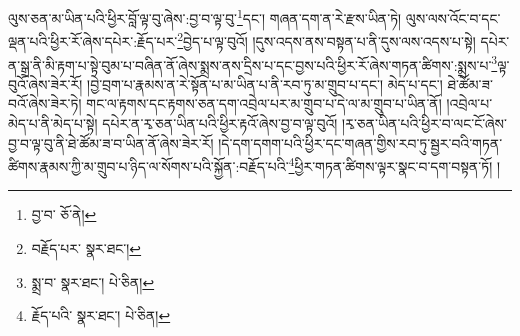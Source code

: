 ལུས་ཅན་མ་ཡིན་པའི་ཕྱིར་བློ་ལྟ་བུ་ཞེས་:བྱ་བ་ལྟ་བུ་\footnote{བྱ་བ་  ཅོ་ནེ། }དང་། གཞན་དག་ན་རེ་རྫས་ཡིན་ཏེ། ལུས་ལས་འོང་བ་དང་ལྡན་པའི་ཕྱིར་རོ་ཞེས་དཔེར་:རྗོད་པར་\footnote{བརྗོད་པར་  སྣར་ཐང་། }བྱེད་པ་ལྟ་བུའོ། །དུས་འདས་ནས་བསྟན་པ་ནི་དུས་ལས་འདས་པ་སྟེ། དཔེར་ན་སྒྲ་ནི་མི་རྟག་པ་སྟེ་བུམ་པ་བཞིན་ནོ་ཞེས་སྨྲས་ནས་དྲིས་པ་དང་བྱས་པའི་ཕྱིར་རོ་ཞེས་གཏན་ཚིགས་:སྨྲས་པ་\footnote{སྨྲ་བ་  སྣར་ཐང་།  པེ་ཅིན། }ལྟ་བུའོ་ཞེས་ཟེར་རོ། །བྱེ་བྲག་པ་རྣམས་ན་རེ་སྟོན་པ་མ་ཡིན་པ་ནི་རབ་ཏུ་མ་གྲུབ་པ་དང་། མེད་པ་དང་། ཐེ་ཚོམ་ཟ་བའོ་ཞེས་ཟེར་ཏེ། གང་ལ་རྟགས་དང་རྟགས་ཅན་དག་འབྲེལ་པར་མ་གྲུབ་པ་དེ་ལ་མ་གྲུབ་པ་ཡིན་ནོ། །འབྲེལ་པ་མེད་པ་ནི་མེད་པ་སྟེ། དཔེར་ན་རྭ་ཅན་ཡིན་པའི་ཕྱིར་རྟའོ་ཞེས་བྱ་བ་ལྟ་བུའོ། །རྭ་ཅན་ཡིན་པའི་ཕྱིར་བ་ལང་ངོ་ཞེས་བྱ་བ་ལྟ་བུ་ནི་ཐེ་ཚོམ་ཟ་བ་ཡིན་ནོ་ཞེས་ཟེར་རོ། །དེ་དག་དགག་པའི་ཕྱིར་དང་གཞན་གྱིས་རབ་ཏུ་སྦྱར་བའི་གཏན་ཚིགས་རྣམས་ཀྱི་མ་གྲུབ་པ་ཉིད་ལ་སོགས་པའི་སྐྱོན་:བརྗོད་པའི་\footnote{རྗོད་པའི་  སྣར་ཐང་།  པེ་ཅིན། }ཕྱིར་གཏན་ཚིགས་ལྟར་སྣང་བ་དག་བསྟན་ཏོ། །
